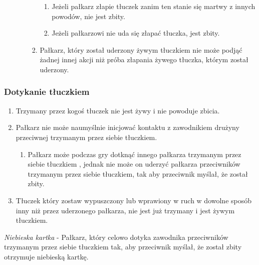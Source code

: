 \documentclass[12pt]{article}
\begin{document}
\begin{enumerate}
\begin{enumerate}
\begin{enumerate}
			                  \begin{enumerate}
				                  \item
				                        Jeżeli pałkarz złapie tłuczek zanim ten stanie się martwy z
				                        innych powodów, nie jest zbity.
				                  \item
				                        Jeżeli pałkarzowi nie uda się złapać tłuczka, jest zbity.
			                  \end{enumerate}
			            \item
			                  Pałkarz, który został uderzony żywym tłuczkiem nie może podjąć
			                  żadnej innej akcji niż próba złapania żywego tłuczka, którym
			                  został uderzony.
		            \end{enumerate}
	      \end{enumerate}
\end{enumerate}

\subsubsection{Dotykanie tłuczkiem}

\begin{enumerate}
	\item
	      Trzymany przez kogoś tłuczek nie jest żywy i nie powoduje zbicia.
	\item
	      Pałkarz nie może naumyślnie inicjować kontaktu z zawodnikiem drużyny
	      przeciwnej trzymanym przez siebie tłuczkiem.

	      \begin{enumerate}
		      \item
		            Pałkarz może podczas gry dotknąć innego pałkarza trzymanym przez
		            siebie tłuczkiem , jednak nie może on uderzyć pałkarza przeciwników
		            trzymanym przez siebie tłuczkiem, tak aby przeciwnik myślał, że
		            został zbity.
	      \end{enumerate}
	\item
	      Tłuczek który zostaw wypuszczony lub wprawiony w ruch w dowolne sposób
	      inny niż przez uderzonego pałkarza, nie jest już trzymany i jest żywym
	      tłuczkiem.
\end{enumerate}

\emph{Niebieska kartka} - Pałkarz, który celowo dotyka zawodnika
przeciwników trzymanym przez siebie tłuczkiem tak, aby przeciwnik
myślał, że został zbity otrzymuje niebieską kartkę.
\end{document}
